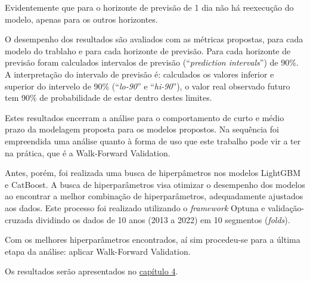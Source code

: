 Evidentemente que para o horizonte de previsão de 1 dia não há reexecução do modelo, apenas para os outros horizontes.

O desempenho dos resultados são avaliados com as métricas propostas, para cada modelo do trablaho e para cada horizonte de previsão. Para cada horizonte de previsão foram calculados intervalos de previsão (``\textit{prediction intervals}'') de 90\%. A interpretação do intervalo de previsão é: calculados os valores inferior e superior do intervelo de 90\% (``\textit{lo-90}'' e ``\textit{hi-90}''), o valor real observado futuro tem 90\% de probabilidade de estar dentro destes limites.\cite{hyndman_fpp3_2024}

Estes resultados encerram a análise para o comportamento de curto e médio prazo da modelagem proposta para os modelos propostos. Na sequência foi empreendida uma análise quanto à forma de uso que este trabalho pode vir a ter na prática, que é a Walk-Forward Validation.

Antes, porém, foi realizada uma busca de hiperpâmetros nos modelos LightGBM e CatBoost. A busca de hiperparâmetros visa otimizar o desempenho dos modelos ao encontrar a melhor combinação de hiperparâmetros, adequadamente ajustados aos dados. Este processo foi realizado utilizando o \textit{framework} Optuna e validação-cruzada dividindo os dados de 10 anos (2013 a 2022) em 10 segmentos (\textit{folds}).\cite{akiba2019optuna}\cite{optuna_docs}\cite{skforecast}

Com os melhores hiperparâmetros encontrados, aí sim procedeu-se para a última etapa da análise: aplicar Walk-Forward Validation.

Os resultados serão apresentados no \hyperref[cap:capitulo4]{capítulo 4}.
\clearpage

